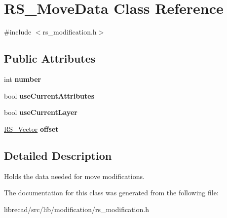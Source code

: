 \hypertarget{classRS__MoveData}{\section{R\-S\-\_\-\-Move\-Data Class Reference}
\label{classRS__MoveData}
}


{\ttfamily \#include $<$rs\-\_\-modification.\-h$>$}

\subsection*{Public Attributes}
\begin{DoxyCompactItemize}
\item 
\hypertarget{classRS__MoveData_a4e264e329da546efbb4d8e59cb1095b9}{int {\bfseries number}}\label{classRS__MoveData_a4e264e329da546efbb4d8e59cb1095b9}

\item 
\hypertarget{classRS__MoveData_a85add6044f718528c485f3b46dd3561a}{bool {\bfseries use\-Current\-Attributes}}\label{classRS__MoveData_a85add6044f718528c485f3b46dd3561a}

\item 
\hypertarget{classRS__MoveData_a8788b3363d4e97b99dbf11cee6d4e15e}{bool {\bfseries use\-Current\-Layer}}\label{classRS__MoveData_a8788b3363d4e97b99dbf11cee6d4e15e}

\item 
\hypertarget{classRS__MoveData_a8a1b249a89e0965c761c43db8a30386a}{\hyperlink{classRS__Vector}{R\-S\-\_\-\-Vector} {\bfseries offset}}\label{classRS__MoveData_a8a1b249a89e0965c761c43db8a30386a}

\end{DoxyCompactItemize}


\subsection{Detailed Description}
Holds the data needed for move modifications. 

The documentation for this class was generated from the following file\-:\begin{DoxyCompactItemize}
\item 
librecad/src/lib/modification/rs\-\_\-modification.\-h\end{DoxyCompactItemize}
